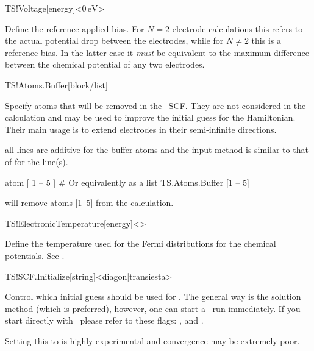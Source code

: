 \begin{fdfentry}{TS!Voltage}[energy]<$0\,\mathrm{eV}$>

  Define the reference applied bias. For $N=2$ electrode calculations
  this refers to the actual potential drop between the electrodes,
  while for $N\neq2$ this is a reference bias. In the latter case it
  \emph{must} be equivalent to the maximum difference between the
  chemical potential of any two electrodes.
  
\end{fdfentry}

\begin{fdfentry}{TS!Atoms.Buffer}[block/list]

  Specify atoms that will be removed in the \tsiesta\ SCF. They are
  not considered in the calculation and may be used to improve the
  initial guess for the Hamiltonian. Their main usage is to extend
  electrodes in their semi-infinite directions.

  \note all lines are additive for the buffer atoms and the input
  method is similar to that of  for the
   line(s).

  \begin{fdfexample}
       atom [ 1 -- 5 ]
    # Or equivalently as a list   
    TS.Atoms.Buffer [1 -- 5]
  \end{fdfexample}
  will remove atoms [1--5] from the calculation.

\end{fdfentry}

\begin{fdfentry}{TS!ElectronicTemperature}[energy]<>

  Define the temperature used for the Fermi distributions for the
  chemical potentials. 
  See .

\end{fdfentry}

\begin{fdfentry}{TS!SCF.Initialize}[string]<diagon|transiesta>%

  Control which initial guess should be used for \tsiesta. The general
  way is the  solution method (which is preferred),
  however, one can start a \tsiesta\ run immediately. If you start
  directly with \tsiesta\ please refer to these flags:
  ,  and
  .
  
  \note Setting this to  is highly experimental and
  convergence may be extremely poor.

\end{fdfentry}

